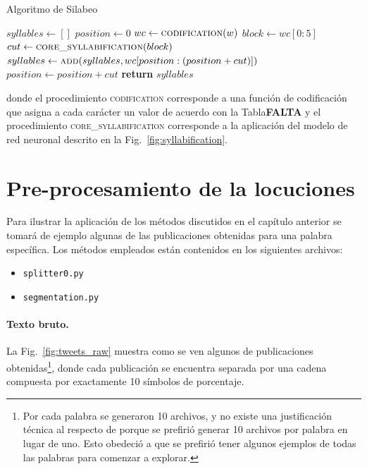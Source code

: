 \begin{megaalgorithm}
	\caption{Algoritmo de Silabeo}
	\label{alg:syllabification}
	\begin{algorithmic}[1]
		\State $syllables\gets []$
		\State $position\gets 0$
		\State $wc\gets \mbox{\textsc{codification}}(w)$
		\State $block\gets wc[0:5]$
		\State $cut\gets \mbox{\textsc{core\_syllabification}}(block)$
		\State $syllables\gets \mbox{\textsc{add}}(syllables,wc[position:(position+cut)])$
		\State $position\gets position + cut$
		\EndWhile
		\State \textbf{return} $syllables$
		\EndProcedure
	\end{algorithmic}
\end{megaalgorithm}
donde el procedimiento \textsc{codification} corresponde a una función de codificación que asigna a cada carácter un valor de acuerdo con la Tabla\textbf{FALTA} y el procedimiento \textsc{core\_syllabification} corresponde a la aplicación del modelo de red neuronal descrito en la Fig.~\ref{fig:syllabification}.
  



\section{Pre-procesamiento de la locuciones}

Para ilustrar la aplicación de los métodos discutidos en el capítulo anterior se tomará de ejemplo algunas de las publicaciones obtenidas para una palabra específica. Los métodos empleados están contenidos en los siguientes archivos:
\begin{itemize}
	\item \texttt{splitter0.py}
	\item \texttt{segmentation.py}
\end{itemize}

\paragraph{Texto bruto.} La Fig.~\ref{fig:tweets_raw} muestra como se ven algunos de publicaciones obtenidas\footnote{Por cada palabra se generaron 10 archivos, y no existe una justificación técnica al respecto de porque se prefirió generar 10 archivos por palabra en lugar de uno. Esto obedeció a que se prefirió tener algunos ejemplos de todas las palabras para comenzar a explorar.}, donde cada publicación se encuentra separada por una cadena compuesta por exactamente 10 símbolos de porcentaje.

